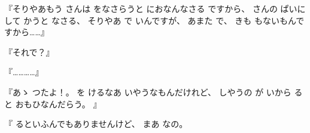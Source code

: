 
『そりやあもう
さんは
をなさらうと
におなんなさる
ですから、
%
さんの
ぱいに
して
かうと
なさる、
%
そりやあ
で
いんですが、
%
あまた
で、
%
きも
もないもんですから……』

『それで？』

『…………』

『あゝ
つたよ！。
%
を
けるなあ
いやうなもんだけれど、
%
しやうの
が
いから
ると
おもひなんだらう。
』

『
るといふんでもありませんけど、
%
まあ
なの。

